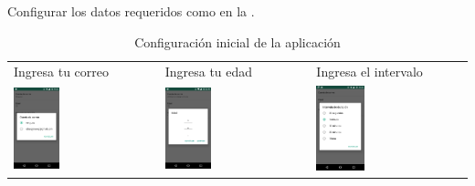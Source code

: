 {Configurar los datos requeridos como en la .
\begin{table}[!h]
\begin{tabular}{lll}
\textsf{\relax 
Ingresa tu correo
} & \textsf{\relax 
Ingresa tu edad
} & \textsf{\relax 
Ingresa el intervalo
}\\
    {\includegraphics[width=0.33\textwidth]{anexos/graphics/app_email.jpg}}
 & 
    {\includegraphics[width=0.33\textwidth]{anexos/graphics/app_age.jpg}}
 & 
    {\includegraphics[width=0.33\textwidth]{anexos/graphics/app_int.jpg}}
\\
\end{tabular}
    \caption{Configuración inicial de la aplicación}\label{config:emedad}
\end{table}

}
